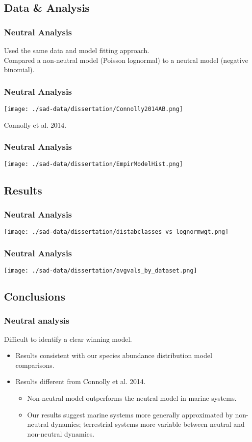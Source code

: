 \documentclass[14pt]{beamer}
\begin{document}
\subsection{Data & Analysis}
\begin{frame}
\frametitle{Neutral Analysis}
Used the same data and model fitting approach.\\
Compared a non-neutral model (Poisson lognormal) to a neutral model (negative binomial).\\
\end{frame}

\begin{frame}{}
\frametitle{Neutral Analysis}
\texttt{[image: ./sad-data/dissertation/Connolly2014AB.png]}
\begin{tiny}
Connolly et al. 2014.
\end{tiny}
\end{frame}

\begin{frame}{}
\frametitle{Neutral Analysis}
\texttt{[image: ./sad-data/dissertation/EmpirModelHist.png]}
\end{frame}

\subsection{Results}
\begin{frame}{}
\frametitle{Neutral Analysis}
\texttt{[image: ./sad-data/dissertation/distabclasses\_vs\_lognormwgt.png]}
\end{frame}

\begin{frame}{}
\frametitle{Neutral Analysis}
\texttt{[image: ./sad-data/dissertation/avgvals\_by\_dataset.png]}
\end{frame}

\subsection{Conclusions}
\begin{frame}
\frametitle{Neutral analysis}
Difficult to identify a clear winning model.
\begin{itemize}
\item Results consistent with our species abundance distribution model comparisons. 
\item Results different from Connolly et al. 2014.
\begin{itemize}
\item Non-neutral model outperforms the neutral model in marine systems.
\item Our results suggest marine systems more generally approximated by non-neutral dynamics; terrestrial systems more variable between neutral and non-neutral dynamics.
\end{itemize}
\end{itemize}
\end{frame}
\end{document}
